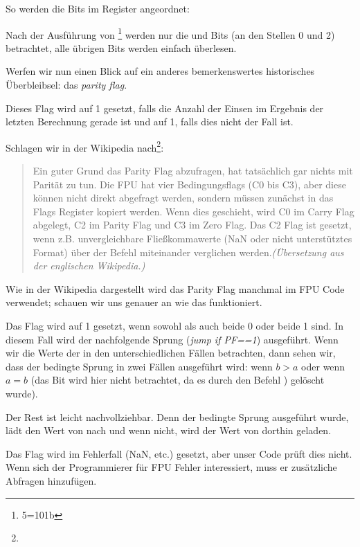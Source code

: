 

So werden die \CThreeBits Bits im \AH Register angeordnet:


Nach der Ausführung von \footnote{5=101b} werden nur die \Czero
und \Ctwo Bits (an den Stellen 0 und 2) betrachtet, alle übrigen Bits werden
einfach überlesen.

\label{parity_flag}
Werfen wir nun einen Blick auf ein anderes bemerkenswertes historisches
Überbleibsel: das \emph{parity flag}.

Dieses Flag wird auf 1 gesetzt, falls die Anzahl der Einsen im Ergebnis der
letzten Berechnung gerade ist und auf 1, falls dies nicht der Fall ist.

Schlagen wir in der Wikipedia nach\footnote{\WikipediaParityFlag}:

\begin{framed}
\begin{quotation}
Ein guter Grund das Parity Flag abzufragen, hat tatsächlich gar nichts mit
Parität zu tun. Die FPU hat vier Bedingungsflags (C0 bis C3), aber diese können
nicht direkt abgefragt werden, sondern müssen zunächst in das Flags Register
kopiert werden. Wenn dies geschieht, wird C0 im Carry Flag abgelegt, C2 im
Parity Flag und C3 im Zero Flag.
Das C2 Flag ist gesetzt, wenn z.B. unvergleichbare Fließkommawerte (NaN oder
nicht unterstütztes Format) über der \FUCOM Befehl miteinander verglichen
werden.\textit{(Übersetzung aus der englischen Wikipedia.)}
\end{quotation}
\end{framed}

Wie in der Wikipedia dargestellt wird das Parity Flag manchmal im FPU Code
verwendet; schauen wir uns genauer an wie das funktioniert.

Das \PF Flag wird auf 1 gesetzt, wenn sowohl \Czero als auch \Ctwo beide 0 oder
beide 1 sind. In diesem Fall wird der nachfolgende Sprung \JP(\emph{jump if
PF==1}) ausgeführt.
Wenn wir die Werte der \CThreeBits in den unterschiedlichen Fällen betrachten,
dann sehen wir, dass der bedingte Sprung \JP in zwei Fällen ausgeführt wird:
wenn $b>a$ oder wenn $a=b$ (das \Cthree Bit wird hier nicht betrachtet, da es
durch den Befehl ) gelöscht wurde).

Der Rest ist leicht nachvollziehbar.
Denn der bedingte Sprung ausgeführt wurde, lädt \FLD den Wert von  nach
 und wenn nicht, wird der Wert von  dorthin geladen.

Das \Ctwo Flag wird im Fehlerfall (\gls{NaN}, etc.) gesetzt, aber unser Code
prüft dies nicht. 
Wenn sich der Programmierer für FPU Fehler interessiert, muss er zusätzliche
Abfragen hinzufügen.


